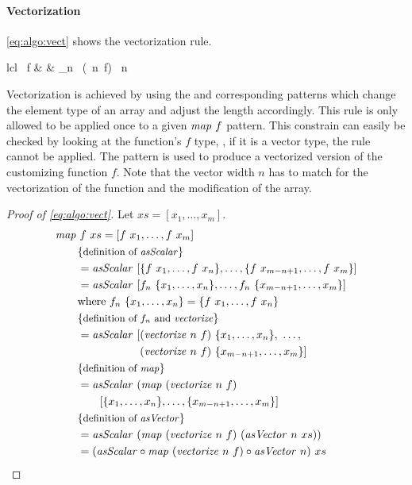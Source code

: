 \paragraph{Vectorization}
\autoref{eq:algo:vect} shows the vectorization rule.
%
\begin{rerule}{lcl}
  \map\ f
    & \rightarrow &
      \asScalar_n
        \circ \map\ (\vect\ n\ f)
        \circ \asVector\ n
  \label{eq:algo:vect}
\end{rerule}
%
Vectorization is achieved by using the \asVector and corresponding \asScalar patterns which change the element type of an array and adjust the length accordingly.
This rule is only allowed to be applied once to a given $\text{\textit{map}}\ f$ pattern.
This constrain can easily be checked by looking at the function's $f$ type, \ie, if it is a vector type, the rule cannot be applied.
The \vect pattern is used to produce a vectorized version of the customizing function $f$.
Note that the vector width $n$ has to match for the vectorization of the function and the modification of the array.

\begin{proof}[Proof of \autoref{eq:algo:vect}]
  Let $xs = [x_1, \ldots, x_m]$.
  \begin{align*}
    &\map\ f\ xs = [f\ x_1, \ldots, f\ x_m]\\
    &\qquad \comment{definition of \asScalar}\\
    &\qquad = \asScalar\ [\{f\ x_1, \ldots, f\ x_n\}, \ldots ,\{f\ x_{m-n+1}, \ldots, f\ x_m\}]\\
    &\qquad = \asScalar\ [f_n\ \{x_1, \ldots, x_n\}, \ldots ,f_n\ \{x_{m-n+1}, \ldots, x_m\}]\\
    &\qquad \text{where } f_n\ \{x_1, \ldots, x_n\} = \{f\ x_1, \ldots, f\ x_n\}\\
    &\qquad \comment{definition of $f_n$ and \vect}\\
    &\qquad = \asScalar\
      \begin{aligned}[t]
        [&(\vect\ n\ f)\ \{x_1, \ldots, x_n\},\ \ldots ,\\
         &(\vect\ n\ f)\ \{x_{m-n+1}, \ldots, x_m\}]
      \end{aligned}\\
    &\qquad \comment{definition of \map}\\
    &\qquad = \asScalar\ (\map\ (\vect\ n\ f)\\
    &\qquad\qquad [\{x_1, \ldots, x_n\}, \ldots ,\{x_{m-n+1}, \ldots, x_m\}]\\
    &\qquad \comment{definition of \asVector}\\
    &\qquad = \asScalar\ (\map\ (\vect\ n\ f)\ (\asVector\ n\ xs))\\
    &\qquad = (\asScalar \circ \map\ (\vect\ n\ f) \circ \asVector\ n)\ xs
  \end{align*}
\end{proof}

